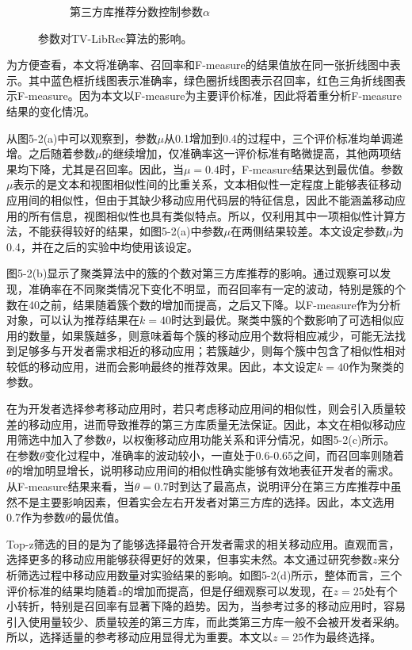 \begin{figure}
\begin{subfigure}[b]{0.49\textwidth}
		\caption{第三方库推荐分数控制参数$\alpha$}
	\end{subfigure}
	\caption{参数对TV-LibRec算法的影响。}
\end{figure}
为方便查看，本文将准确率、召回率和F-measure的结果值放在同一张折线图中表示。其中蓝色框折线图表示准确率，绿色圈折线图表示召回率，红色三角折线图表示F-measure。因为本文以F-measure为主要评价标准，因此将着重分析F-measure结果的变化情况。

从图5-2(a)中可以观察到，参数$\mu$从0.1增加到0.4的过程中，三个评价标准均单调递增。之后随着参数$\mu$的继续增加，仅准确率这一评价标准有略微提高，其他两项结果均下降，尤其是召回率。因此，当$\mu=0.4$时，F-measure结果达到最优值。参数$\mu$表示的是文本和视图相似性间的比重关系，文本相似性一定程度上能够表征移动应用间的相似性，但由于其缺少移动应用代码层的特征信息，因此不能涵盖移动应用的所有信息，视图相似性也具有类似特点。所以，仅利用其中一项相似性计算方法，不能获得较好的结果，如图5-2(a)中参数$\mu$在两侧结果较差。本文设定参数$\mu$为0.4，并在之后的实验中均使用该设定。

图5-2(b)显示了聚类算法中的簇的个数对第三方库推荐的影响。通过观察可以发现，准确率在不同聚类情况下变化不明显，而召回率有一定的波动，特别是簇的个数在40之前，结果随着簇个数的增加而提高，之后又下降。以F-measure作为分析对象，可以认为推荐结果在$k=40$时达到最优。聚类中簇的个数影响了可选相似应用的数量，如果簇越多，则意味着每个簇的移动应用个数将相应减少，可能无法找到足够多与开发者需求相近的移动应用；若簇越少，则每个簇中包含了相似性相对较低的移动应用，进而会影响最终的推荐效果。因此，本文设定$k=40$作为聚类的参数。

在为开发者选择参考移动应用时，若只考虑移动应用间的相似性，则会引入质量较差的移动应用，进而导致推荐的第三方库质量无法保证。因此，本文在相似移动应用筛选中加入了参数$\theta$，以权衡移动应用功能关系和评分情况，如图5-2(c)所示。在参数$\theta$变化过程中，准确率的波动较小，一直处于0.6-0.65之间，而召回率则随着$\theta$的增加明显增长，说明移动应用间的相似性确实能够有效地表征开发者的需求。从F-measure结果来看，当$\theta=0.7$时到达了最高点，说明评分在第三方库推荐中虽然不是主要影响因素，但着实会左右开发者对第三方库的选择。因此，本文选用0.7作为参数$\theta$的最优值。

Top-z筛选的目的是为了能够选择最符合开发者需求的相关移动应用。直观而言，选择更多的移动应用能够获得更好的效果，但事实未然。本文通过研究参数$z$来分析筛选过程中移动应用数量对实验结果的影响。如图5-2(d)所示，整体而言，三个评价标准的结果均随着$z$的增加而提高，但是仔细观察可以发现，在$z=25$处有个小转折，特别是召回率有显著下降的趋势。因为，当参考过多的移动应用时，容易引入使用量较少、质量较差的第三方库，而此类第三方库一般不会被开发者采纳。所以，选择适量的参考移动应用显得尤为重要。本文以$z=25$作为最终选择。

